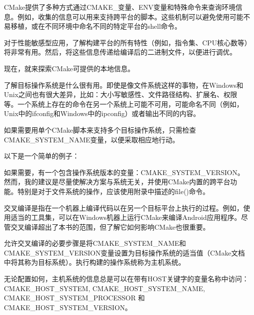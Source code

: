CMake提供了多种方式通过CMAKE\_变量、ENV变量和特殊命令来查询环境信息。例如，收集的信息可以用来支持跨平台的脚本。这些机制可以避免使用可能不易移植，或在不同环境中命名不同的特定平台的shell命令。

对于性能敏感型应用，了解构建平台的所有特性（例如，指令集、CPU核心数等）将非常有用。然后，将这些信息传递给编译后的二进制文件，以便进行调优。

现在，就来探索CMake可提供的本地信息。


了解目标操作系统是什么很有用。即使是像文件系统这样的事物，在Windows和Unix之间也有很大差异，比如：大小写敏感性、文件路径结构、扩展名、权限等。一个系统上存在的命令在另一个系统上可能不可用，可能命名不同（例如，Unix中的ifconfig和Windows中的ipconfig）或者输出不同的内容。

如果需要用单个CMake脚本来支持多个目标操作系统，只需检查CMAKE\_SYSTEM\_NAME变量，以便采取相应地行动。

以下是一个简单的例子：


如果需要，有一个包含操作系统版本的变量：CMAKE\_SYSTEM\_VERSION。然而，我的建议是尽量使解决方案与系统无关，并使用CMake内置的跨平台功能。特别是对于文件系统的操作，应该使用附录中描述的file()命令。


交叉编译是指在一个机器上编译代码以在另一个目标平台上执行的过程。例如，使用适当的工具集，可以在Windows机器上运行CMake来编译Android应用程序。尽管交叉编译超出了本书的范围，但了解它如何影响CMake也很重要。

允许交叉编译的必要步骤是将CMAKE\_SYSTEM\_NAME和CMAKE\_SYSTEM\_VERSION变量设置为目标操作系统的适当值（CMake文档中将其称为目标系统）。执行构建的操作系统称为主机系统。

无论配置如何，主机系统的信息总是可以在带有HOST关键字的变量名称中访问： CMAKE\_HOST\_SYSTEM, CMAKE\_HOST\_SYSTEM\_NAME, CMAKE\_HOST\_SYSTEM\_PROCESSOR 和 CMAKE\_HOST\_SYSTEM\_VERSION。

